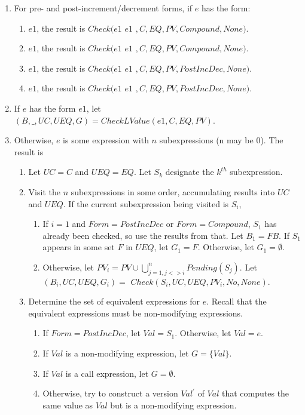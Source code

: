 \begin{enumerate}
\item For pre- and post-increment/decrement forms, if $e$ has the form:
\begin{enumerate}
\item \code{++}$e1$, the result is  $Check(e1$ \code{ = } $e1$ $,C, EQ, PV, 
Compound, None)$.
\item \code{--}$e1$, the result is $Check(e1$ \code{ = } $e1$ $, C, EQ, PV,
Compound, None)$.
\item $e1$\code{++}, the result is  $Check(e1$ \code{ = } $ e1$ $,
C, EQ, PV, PostIncDec, None)$.
\item $e1$\code{--}, the result is $Check(e1$ \code{ = } $ e1$ $, C, EQ, PV, PostIncDec, None)$.
\end{enumerate}
\item If $e$ has the form \code{&}$e1$, let $(B, \_, \mathit{UC}, UEQ, G) = CheckLValue(e1, C, EQ, PV)$.
      
\item Otherwise, $e$ is some expression with $n$ subexpressions (n may be 0).  The
result is 
\label{list:check-unordered-operands}
\begin{enumerate}
\item Let $\mathit{UC} = C$ and $UEQ = EQ$.  Let $S_k$ designate the $k^{th}$ subexpression.
\item Visit the $n$ subexpressions in some order, accumulating results into $\mathit{UC}$ and $UEQ$.  If the current subexpression being visited is $S_i$,
\begin{enumerate}
\item If $i = 1$ and $Form = PostIncDec$ or $Form = Compound$, $S_1$ has already
been checked, so use the results from that.  Let $B_1 = FB$.  If $S_1$ appears in some set $F$ in $UEQ$,
 let $G_1 = F$. Otherwise, let $G_1 = \emptyset$.
\item Otherwise, let $PV_i = PV \cup \bigcup_{j= 1, j <> i}^{n} Pending(S_j)$.
Let $(B_i, \mathit{UC}, UEQ, G_i) =$  $Check(S_i, \mathit{UC}, UEQ, PV_i, No, None)$.
\end{enumerate}
\item Determine the set of equivalent expressions for $e$.  Recall that the equivalent expressions must be non-modifying expressions.
\begin{enumerate}
\item  If $Form = PostIncDec$, let $Val = S_1$.  Otherwise, let $Val = e$.
\item If $Val$ is a non-modifying expression, let $G  = \{ Val \}$.
\item If $Val$ is a call expression, let $G = \emptyset$.
\item Otherwise, try to construct a version $Val^\prime$ of $Val$ that computes the same value 
      as $Val$ but is a non-modifying expression. 
      

\end{enumerate}
\end{enumerate}
\end{enumerate}
